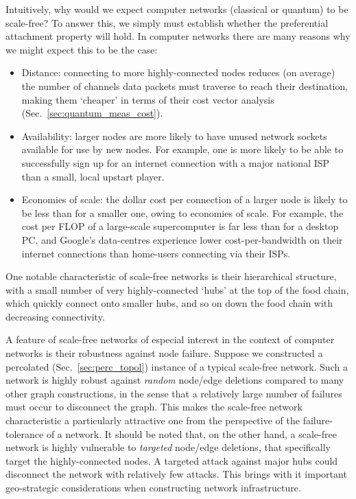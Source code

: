 Intuitively, why would we expect computer networks (classical or quantum) to be scale-free? To answer this, we simply must establish whether the preferential attachment property will hold. In computer networks there are many reasons why we might expect this to be the case:
\begin{itemize}
	\item Distance: connecting to more highly-connected nodes reduces (on average) the number of channels data packets must traverse to reach their destination, making them `cheaper' in terms of their cost vector analysis (Sec.~\ref{sec:quantum_meas_cost}).
	\item Availability: larger nodes are more likely to have unused network sockets available for use by new nodes. For example, one is more likely to be able to successfully sign up for an internet connection with a major national ISP than a small, local upstart player.
	\item Economies of scale: the dollar cost per connection of a larger node is likely to be less than for a smaller one, owing to economies of scale. For example, the cost per FLOP of a large-scale supercomputer is far less than for a desktop PC, and Google's data-centres experience lower cost-per-bandwidth on their internet connections than home-users connecting via their ISPs.
\end{itemize}

One notable characteristic of scale-free networks is their hierarchical structure, with a small number of very highly-connected `hubs' at the top of the food chain, which quickly connect onto smaller hubs, and so on down the food chain with decreasing connectivity.

A feature of scale-free networks of especial interest in the context of computer networks is their robustness against node failure. Suppose we constructed a percolated (Sec.~\ref{sec:perc_topol}) instance of a typical scale-free network. Such a network is highly robust against \textit{random} node/edge deletions compared to many other graph constructions, in the sense that a relatively large number of failures must occur to disconnect the graph. This makes the scale-free network characteristic a particularly attractive one from the perspective of the failure-tolerance of a network. It should be noted that, on the other hand, a scale-free network is highly vulnerable to \textit{targeted} node/edge deletions, that specifically target the highly-connected nodes. A targeted attack against major hubs could disconnect the network with relatively few attacks. This brings with it important geo-strategic considerations when constructing network infrastructure.

